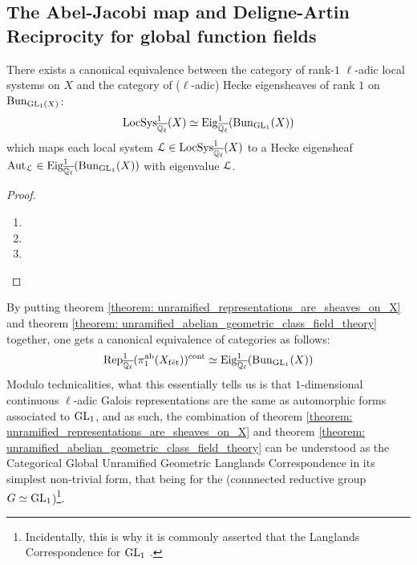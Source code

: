     \subsection{The Abel-Jacobi map and Deligne-Artin Reciprocity for global function fields}
        \begin{theorem} \label{theorem: unramified_abelian_geometric_class_field_theory}
            There exists a canonical equivalence between the category of rank-$1$ $\ell$-adic local systems on $X$ and the category of ($\ell$-adic) Hecke eigensheaves of rank $1$ on $\mathrm{Bun}_{\operatorname{GL}_1(X)}$:
                $$\mathrm{LocSys}_{\overline{\mathbb{Q}_{\ell}}}^1(X) \simeq \mathrm{Eig}^1_{\overline{\mathbb{Q}_{\ell}}}(\mathrm{Bun}_{\operatorname{GL}_1}(X))$$
            which maps each local system $\mathcal{L} \in \mathrm{LocSys}_{\overline{\mathbb{Q}_{\ell}}}^1(X)$ to a Hecke eigensheaf $\mathrm{Aut}_{\mathcal{L}} \in \mathrm{Eig}^1_{\overline{\mathbb{Q}_{\ell}}}(\mathrm{Bun}_{\operatorname{GL}_1}(X))$ with eigenvalue $\mathcal{L}$.
        \end{theorem}
            \begin{proof}
                \noindent
                \begin{enumerate}
                    \item 
                    \item
                    \item 
                \end{enumerate}
            \end{proof}
        \begin{remark} \label{remark: unramified_abelian_geometric_class_field_theory_explanation}
            By putting theorem \ref{theorem: unramified_representations_are_sheaves_on_X} and theorem \ref{theorem: unramified_abelian_geometric_class_field_theory} together, one gets a canonical equivalence of categories as follows:
                $$\mathrm{Rep}_{\overline{\mathbb{Q}_{\ell}}}^1(\pi_1^{\mathrm{ab}}(X_{\mathrm{f\acute{e}t}}))^{\mathrm{cont}} \simeq \mathrm{Eig}^1_{\overline{\mathbb{Q}_{\ell}}}(\mathrm{Bun}_{\operatorname{GL}_1}(X))$$
            Modulo technicalities, what this essentially tells us is that $1$-dimensional continuous $\ell$-adic Galois representations are the same as automorphic forms associated to $\operatorname{GL}_1$, and as such, the combination of theorem \ref{theorem: unramified_representations_are_sheaves_on_X} and theorem \ref{theorem: unramified_abelian_geometric_class_field_theory} can be understood as the Categorical Global Unramified Geometric Langlands Correspondence in its simplest non-trivial form, that being for the (connnected reductive group $G \simeq \operatorname{GL}_1$)\footnote{Incidentally, this is why it is commonly asserted that the Langlands Correspondence for $\operatorname{GL}_1$ .}. 
        \end{remark}
